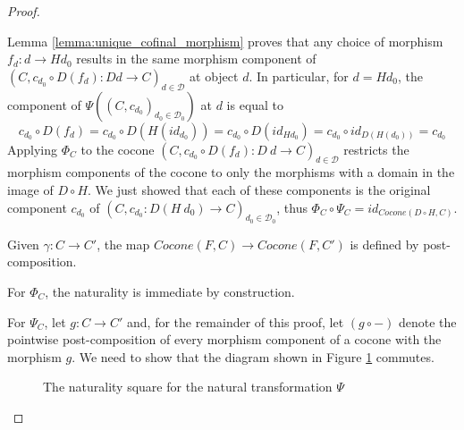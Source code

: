 \documentclass{msthesis}
\theoremstyle{definition}
\newcommand{\mcD}{\mathcal{D}}
\newcommand{\mcDo}{\mathcal{D}_0}
\begin{document}
\begin{proof}
\begin{description}
        Lemma \ref{lemma:unique_cofinal_morphism} proves that any choice of morphism $f_d : d \to H d_0$ results in the same morphism component of $(C, c_{d_0} \circ D(f_d) : D d \to C)_{d \in \mcD}$ at object $d$.  In particular, for $d = H d_0$, the component of $\Psi((C, c_{d_0})_{d_0 \in \mcDo})$ at $d$ is equal to 
        \[ c_{d_0} \circ D(f_d) = c_{d_0} \circ D(H(id_{d_0})) = c_{d_0} \circ D(id_{H d_0}) = c_{d_0} \circ id_{D(H(d_0))} = c_{d_0} \]
        Applying $\Phi_C$ to the cocone $(C, c_{d_0} \circ D(f_d) : D\ d \to C)_{d \in \mcD}$ restricts the morphism components of the cocone to only the morphisms with a domain in the image of $D \circ H$.  We just showed that each of these components is the original component $c_{d_0}$ of $(C, c_{d_0} : D(H\ d_0) \to C)_{d_0 \in \mcDo}$, thus $\Phi_C \circ \Psi_C = id_{Cocone(D \circ H, C)}$.

        \item[(3) Naturality: ]
        Given $\gamma : C \to C'$, the map $Cocone(F,C) \to Cocone(F,C')$ is defined by post-composition.
       
        For $\Phi_C$, the naturality is immediate by construction.

        For $\Psi_C$, let $g : C \to C'$ and, for the remainder of this proof, let $(g \circ -)$ denote the pointwise post-composition of every morphism component of a cocone with the morphism $g$.  We need to show that the diagram shown in Figure \ref{fig:natpsi} commutes.

        \begin{figure}[htbp]
            \caption{The naturality square for the natural transformation $\Psi$}\label{fig:natpsi}
            \end{figure}    


\end{description}
\end{proof}
\end{document}
